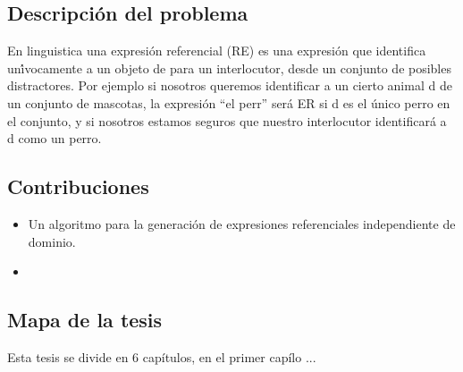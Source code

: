 
\subsection{Descripci\'on del problema}


En linguistica una expresi\'on referencial (RE) es una expresi\'on que identifica un\'{ì}vocamente a un objeto de para un interlocutor, 
desde un conjunto de posibles distractores. Por ejemplo si nosotros queremos identificar a un cierto animal d de un conjunto de mascotas, 
la expresi\'on ``el perr'' ser\'a ER si d es el \'unico perro en el conjunto, y si nosotros estamos seguros que nuestro interlocutor 
identificar\'a a d como un perro.


\subsection{Contribuciones}

\begin{itemize}
 \item Un algoritmo para la generaci\'on de expresiones referenciales independiente de dominio.
 \item
\end{itemize}

\subsection{Mapa de la tesis}
Esta tesis se divide en 6 cap\'{i}tulos, en el primer cap\'{i}lo ...

